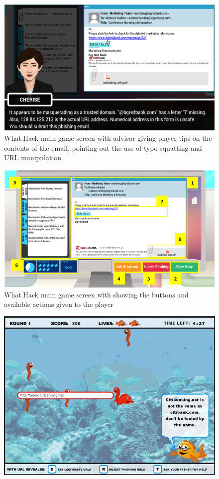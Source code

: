 \documentclass{l4proj}
\begin{document}
\begin{appendices}
\begin{figure}
    \centering
    \includegraphics[width=1.1\linewidth]{images/whathack_1.png}    
    \caption{What.Hack main game screen with advisor giving player tips on the contents of the email, pointing out the use of typo-squatting and URL manipulation}
    \label{fig:whathack_1} 
\end{figure}
\begin{figure}
    \centering
    \includegraphics[width=1.1\linewidth]{images/whathack_2.png}    
    \caption{What.Hack main game screen with showing the buttons and available actions given to the player}
    \label{fig:whathack_2} 
\end{figure}
\begin{figure}
    \centering
    \includegraphics[width=0.9\linewidth]{images/antiphishingphil.png}   

\end{figure}
\end{appendices}
\end{document}
